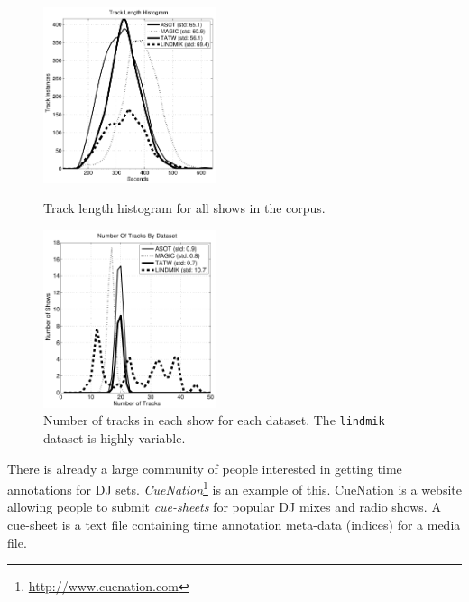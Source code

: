 \documentclass[twocolumn]{article}
\begin{document}
	\begin{figure}
		\centering
		\includegraphics[width=0.45\textwidth]{images/trackhist}
		
		\caption{Track length histogram for all shows in the corpus.}
		
		\bigskip
		\includegraphics[width=0.45\textwidth]{images/numtracks}
		
		\caption{Number of tracks in each show for each dataset. The \texttt{lindmik} dataset is highly variable.}
		\label{fig:tracklengths}
	\end{figure} 
	
	There is already a large community of people interested in getting time annotations for DJ sets. \textit{CueNation}\footnote{\url{http://www.cuenation.com}} is an example of this. CueNation is a website allowing people to submit \textit{cue-sheets} for popular DJ mixes and radio shows. A cue-sheet is a text file containing time annotation meta-data (indices) for a media file.
	
\end{document}

